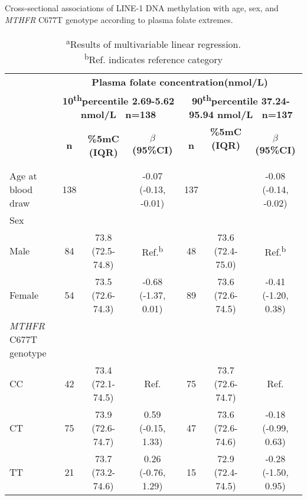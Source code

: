 \begin{flushleft}
\begin{table} [h]
\caption{Cross-sectional associations of LINE-1 DNA methylation with age, sex, and \emph{MTHFR} C677T genotype according to plasma folate extremes.}\label{table3_2}
\begin{adjustbox}{width=\textwidth}
\renewcommand{\arraystretch}{1.3}
\begin{tabular}{lcccccc}
\hline 
~ &\multicolumn{6}{c}{\centering \textbf{Plasma folate concentration(nmol/L)}}\\
\bfseries
&\multicolumn{3}{c}{\parbox[t]{3cm}{\centering \textbf{ 10\textsuperscript{th}percentile 2.69-5.62 nmol/L \ n=138\\}}} 
&\multicolumn{3}{c}{\parbox[t]{3cm}{\centering \textbf{ 90\textsuperscript{th}percentile 37.24-95.94 nmol/L \ n=137\\}}}\\
~ & \textbf{n} & \textbf{\%5mC (IQR)} & \textbf{$\beta$ (95\%CI)} & \textbf{n} & \textbf{ \%5mC (IQR)} ~ & \textbf{$\beta$ (95\%CI)}\\
\hline
Age at blood draw & 138 &~ & {}-0.07 (-0.13, -0.01) & 137 &~ & {}-0.08 (-0.14, -0.02)\\
Sex &~ &~ &~ &~ &~ &~\\ \quad Male & 84 & 73.8 (72.5-74.8) & Ref.\textsuperscript{b} & 48 & 73.6 (72.4-75.0) & Ref.\textsuperscript{b}\\ \quad Female & 54 & 73.5 (72.6-74.3) & {}-0.68 (-1.37, 0.01) & 89 & 73.6 (72.6-74.5) & {}-0.41 (-1.20, 0.38)\\
{\textit{MTHFR}}{ C677T genotype}&~ &~ &~ &~ &~ &~\\ \quad CC & 42 & 73.4 (72.1-74.5) & Ref. & 75 & 73.7 (72.6-74.7) & Ref.\\ \quad CT & 75 & 73.9 (72.6-74.7) & 0.59 (-0.15, 1.33) & 47 & 73.6 (72.6-74.6) & {}-0.18 (-0.99, 0.63)\\ \quad TT & 21 & 73.7 (73.2-74.6) & 0.26 (-0.76, 1.29) & 15 & 72.9 (72.4-74.5) & {}-0.28 (-1.50, 0.95)\\
\hline 
\end{tabular}
\end{adjustbox}
\caption*{\footnotesize{\textsuperscript{a}Results of multivariable linear regression.\\ \textsuperscript{b}Ref. indicates reference	category}}
\end{table}
\end{flushleft}



